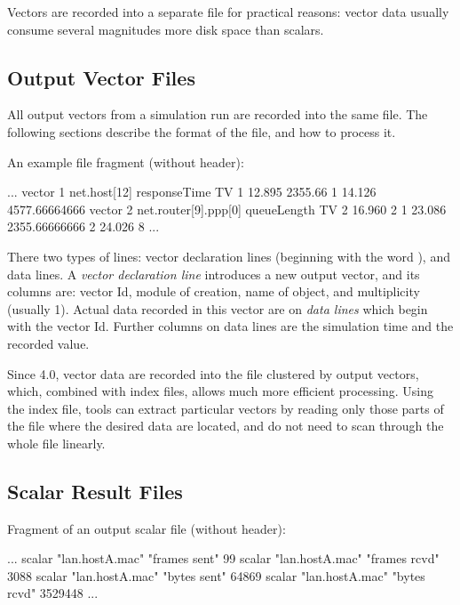 
Vectors are recorded into a separate file for practical reasons: vector
data usually consume several magnitudes more disk space than scalars.

\subsection{Output Vector Files}
\label{sec:ana-sim:output-vector-files}

All output vectors from a simulation run are recorded into the same file.
The following sections describe the format of the file, and
how to process it.

An example file fragment (without header):

\begin{filelisting}
...
vector 1   net.host[12]  responseTime  TV
1  12.895  2355.66
1  14.126  4577.66664666
vector 2   net.router[9].ppp[0] queueLength  TV
2  16.960  2
1  23.086  2355.66666666
2  24.026  8
...
\end{filelisting}

There two types of lines: vector declaration lines (beginning with the word
), and data lines. A \textit{vector declaration line}
introduces a new output vector, and its columns are: vector Id, module of
creation, name of  object, and multiplicity (usually 1).
Actual data recorded in this vector are on \textit{data lines} which begin
with the vector Id. Further columns on data lines are the simulation time
and the recorded value.


Since {\opp} 4.0, vector data are recorded into the file clustered by
output vectors, which, combined with index files, allows much more
efficient processing. Using the index file, tools can extract particular
vectors by reading only those parts of the file where the desired data are
located, and do not need to scan through the whole file linearly.


\subsection{Scalar Result Files}
\label{sec:ana-sim:scalar-result-files}

Fragment of an output scalar file (without header):

\begin{filelisting}
...
scalar "lan.hostA.mac" "frames sent"  99
scalar "lan.hostA.mac" "frames rcvd"  3088
scalar "lan.hostA.mac" "bytes sent"   64869
scalar "lan.hostA.mac" "bytes rcvd"   3529448
...
\end{filelisting}

